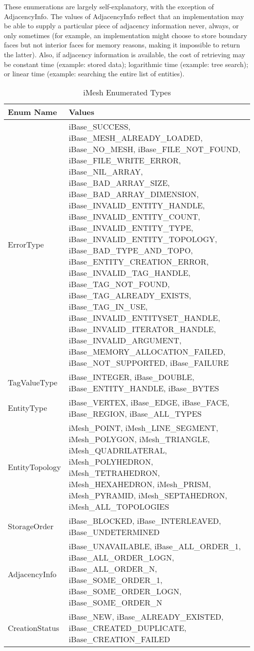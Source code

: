 These enumerations are largely self-explanatory, with the exception of
AdjacencyInfo. The values of AdjacencyInfo reflect that an
implementation may be able to supply a particular piece of adjacency
information never, always, or only sometimes (for example, an
implementation might choose to store boundary faces but not interior
faces for memory reasons, making it impossible to return the
latter). Also, if adjacency information is available, the cost of
retrieving may be constant time (example: stored data); logarithmic time
(example: tree search); or linear time (example: searching the entire
list of entities). %
\begin{table}[htp]

\caption{iMesh Enumerated Types}

\label{table:Enums} {\small }\begin{tabular}{|l|p{5in}|}
\hline 
{\small Enum Name}&
{\small Values}\tabularnewline
\hline
\hline 
{\small ErrorType}&
{\small \raggedright iBase\_SUCCESS, iBase\_MESH\_ALREADY\_LOADED,
iBase\_NO\_MESH, iBase\_FILE\_NOT\_FOUND, iBase\_FILE\_WRITE\_ERROR,
iBase\_NIL\_ARRAY, iBase\_BAD\_ARRAY\_SIZE, iBase\_BAD\_ARRAY\_DIMENSION,
iBase\_INVALID\_ENTITY\_HANDLE, iBase\_INVALID\_ENTITY\_COUNT, iBase\_INVALID\_ENTITY\_TYPE,
iBase\_INVALID\_ENTITY\_TOPOLOGY, iBase\_BAD\_TYPE\_AND\_TOPO, iBase\_ENTITY\_CREATION\_ERROR,
iBase\_INVALID\_TAG\_HANDLE, iBase\_TAG\_NOT\_FOUND, iBase\_TAG\_ALREADY\_EXISTS,
iBase\_TAG\_IN\_USE, iBase\_INVALID\_ENTITYSET\_HANDLE, iBase\_INVALID\_ITERATOR\_HANDLE,
iBase\_INVALID\_ARGUMENT, iBase\_MEMORY\_ALLOCATION\_FAILED, iBase\_NOT\_SUPPORTED,
iBase\_FAILURE }\tabularnewline
\hline 
{\small TagValueType}&
{\small \raggedright iBase\_INTEGER, iBase\_DOUBLE, iBase\_ENTITY\_HANDLE,
iBase\_BYTES}\tabularnewline
\hline 
{\small EntityType}&
{\small \raggedright iBase\_VERTEX, iBase\_EDGE, iBase\_FACE, iBase\_REGION,
iBase\_ALL\_TYPES}\tabularnewline
\hline 
{\small EntityTopology}&
{\small \raggedright iMesh\_POINT, iMesh\_LINE\_SEGMENT, iMesh\_POLYGON,
iMesh\_TRIANGLE, iMesh\_QUADRILATERAL, iMesh\_POLYHEDRON, iMesh\_TETRAHEDRON,
iMesh\_HEXAHEDRON, iMesh\_PRISM, iMesh\_PYRAMID, iMesh\_SEPTAHEDRON,
iMesh\_ALL\_TOPOLOGIES}\tabularnewline
\hline 
{\small StorageOrder}&
{\small \raggedright iBase\_BLOCKED, iBase\_INTERLEAVED, iBase\_UNDETERMINED}\tabularnewline
\hline 
{\small AdjacencyInfo}&
{\small \raggedright iBase\_UNAVAILABLE, iBase\_ALL\_ORDER\_1, iBase\_ALL\_ORDER\_LOGN,
iBase\_ALL\_ORDER\_N, iBase\_SOME\_ORDER\_1, iBase\_SOME\_ORDER\_LOGN,
iBase\_SOME\_ORDER\_N}\tabularnewline
\hline 
{\small CreationStatus}&
{\small \raggedright iBase\_NEW, iBase\_ALREADY\_EXISTED, iBase\_CREATED\_DUPLICATE,
iBase\_CREATION\_FAILED}\tabularnewline
\hline
\end{tabular} 
\end{table}


